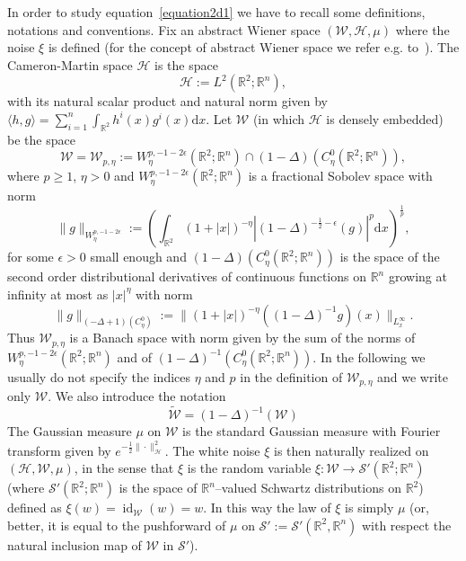 \documentclass[a4paper,10pt]{article}
\newcommand{\assign}{:=}
\newcommand{\mathd}{\mathrm{d}}
\newcommand{\tmop}[1]{\ensuremath{\operatorname{#1}}}
\begin{document}
In order to study equation~{\eqref{equation2d1}} we have to recall some
definitions, notations and conventions. Fix an abstract Wiener space
$(\mathcal{W}, \mathcal{H}, \mu)$ where the noise $\xi$ is defined (for the
concept of abstract Wiener space we refer e.g.
to~{\cite{Gross1967,Nualart2006,Ustunel2000}}). The Cameron-Martin space
$\mathcal{H}$ is the space
\[ \mathcal{H} \assign L^2 (\mathbb{R}^2 ; \mathbb{R}^n), \]
with its natural scalar product and natural norm given by $\langle h, g
\rangle = \sum_{i = 1}^n \int_{\mathbb{R}^2} h^i (x) g^i (x) \mathd x$. Let
$\mathcal{W}$ (in which $\mathcal{H}$ is densely embedded) be the space
\begin{equation}
  \mathcal{W}=\mathcal{W}_{p, \eta} \assign W^{p, - 1 - 2 \epsilon}_{\eta}
  (\mathbb{R}^2 ; \mathbb{R}^n) \cap (1 - \Delta) (C^0_{\eta} (\mathbb{R}^2 ;
  \mathbb{R}^n)), \label{eq:Banach1}
\end{equation}
where $p \geqslant 1$, $\eta > 0$ and $W_{\eta}^{p, - 1 - 2 \epsilon}
(\mathbb{R}^2 ; \mathbb{R}^n)$ is a fractional Sobolev space with norm
\[ \|g\|_{W_{\eta}^{p, - 1 - 2 \epsilon}} \assign \left( \int_{\mathbb{R}^2}
   (1 + | x |)^{- \eta} \left| (1 - \Delta)^{- \frac{1}{2} - \epsilon} (g)
   \right|^p \mathd x \right)^{\frac{1}{p}}, \]
for some $\epsilon > 0$ small enough and $(1 - \Delta) (C^0_{\eta}
(\mathbb{R}^2 ; \mathbb{R}^n))$ is the space of the second order
distributional derivatives of continuous functions on $\mathbb{R}^n$ growing
at infinity at most as $| x |^{\eta}$ with norm
\[ \|g\|_{(- \Delta + 1) (C^0_{\eta})} \assign \| (1 + | x |)^{- \eta} ((1 -
   \Delta)^{- 1} g) (x) \|_{L^{\infty}_x} . \]
Thus $\mathcal{W}_{p, \eta}$ is a Banach space with norm given by the sum of
the norms of $W_{\eta}^{p, - 1 - 2 \epsilon} (\mathbb{R}^2 ; \mathbb{R}^n)$
and of $(1 - \Delta)^{- 1} (C^0_{\eta} (\mathbb{R}^2 ; \mathbb{R}^n))$. In the
following we usually do not specify the indices $\eta$ and $p$ in the
definition of $\mathcal{W}_{p, \eta}$ and we write only $\mathcal{W}$. We also
introduce the notation
\begin{equation}
  \tilde{\mathcal{W}} = (1 - \Delta)^{- 1} (\mathcal{W}) \label{eq:Banch2}
\end{equation}
The Gaussian measure $\mu$ on $\mathcal{W}$ is the standard Gaussian measure
with Fourier transform given by $e^{- \frac{1}{2} \| \cdot
\|^2_{\mathcal{H}}}$. The white noise $\xi$ is then naturally realized on
$(\mathcal{H}, \mathcal{W}, \mu)$, in the sense that $\xi$ is the random
variable $\xi : \mathcal{W} \rightarrow \mathcal{S}' (\mathbb{R}^2 ;
\mathbb{R}^n)$ (where $\mathcal{S}' (\mathbb{R}^2 ; \mathbb{R}^n)$ is the
space of $\mathbb{R}^n$--valued Schwartz distributions on $\mathbb{R}^2$)
defined as $\xi (w) = \tmop{id}_{\mathcal{W}} (w) = w$. In this way the law of
$\xi$ is simply $\mu$ (or, better, it is equal to the pushforward of $\mu$ on
$\mathcal{S}' \assign \mathcal{S}' (\mathbb{R}^2, \mathbb{R}^n)$ with respect
the natural inclusion map of $\mathcal{W}$ in $\mathcal{S}'$).
\end{document}
